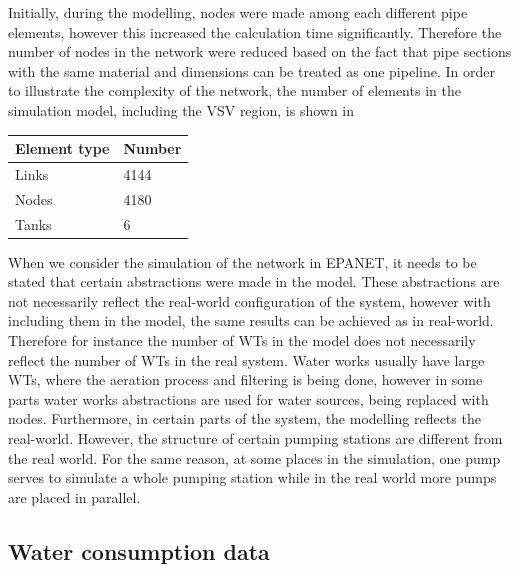 Initially, during the modelling, nodes were made among each different pipe elements, however this increased the calculation time significantly. Therefore the number of nodes in the network were reduced based on the fact that pipe sections with the same material and dimensions can be treated as one pipeline. In order to illustrate the complexity of the network, the number of elements in the simulation model, including the VSV region, is shown in 

\begin{center}
\label{numberofelements_table}
    \begin{tabular}{ | p{3cm} | p{3cm} |}
    \hline
    \textbf{Element type} & \textbf{Number}  \\ 
    \hline
    Links & 4144  \\ 
    \hline
    Nodes & 4180  \\ 
    \hline
    Tanks & 6  \\ 
    \hline
    \end{tabular}
\end{center}

\vspace{-3mm}

When we consider the simulation of the network in EPANET, it needs to be stated that certain abstractions were made in the model. These abstractions are not necessarily reflect the real-world configuration of the system, however with including them in the model, the same results can be achieved as in real-world. Therefore for instance the number of WTs in the model does not necessarily reflect the number of WTs in the real system. Water works usually have large WTs, where the aeration process and filtering is being done, however in some parts water works abstractions are used for water sources, being replaced with nodes. Furthermore, in certain parts of the system, the modelling reflects the real-world. However, the structure of certain pumping stations are different from the real world. For the same reason, at some places in the simulation, one pump serves to simulate a whole pumping station while in the real world more pumps are placed in parallel. 

\subsection{Water consumption data}
\label{water_consumption_data}

